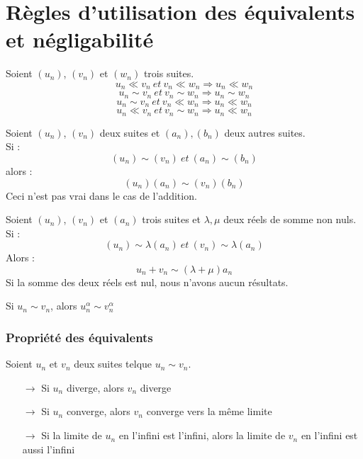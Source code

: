 \section{Règles d'utilisation des équivalents et négligabilité}
\begin{prop}
Soient $(u_n)$, $(v_n)$ et $(w_n)$ trois suites.
$$u_n \ll v_n~ et~ v_n \ll w_n \Rightarrow u_n \ll w_n$$
$$u_n \sim v_n~ et~ v_n \sim w_n \Rightarrow u_n \sim w_n$$
$$u_n \sim v_n~ et~ v_n \ll w_n \Rightarrow u_n \ll w_n$$
$$u_n \ll v_n~ et~ v_n \sim w_n \Rightarrow u_n \ll w_n$$
\end{prop}
\begin{prop}
Soient $(u_n)$, $(v_n)$ deux suites et $(a_n),(b_n)$ deux autres suites.\\
Si :
$$(u_n)\sim(v_n)~ et ~ (a_n)\sim(b_n)$$
alors :
$$(u_n)(a_n) \sim (v_n)(b_n)$$
Ceci n'est pas vrai dans le cas de l'addition.
\end{prop}
\begin{prop}
Soient $(u_n)$, $(v_n)$ et $(a_n)$ trois suites et $\lambda,\mu$ deux réels de somme non nuls.\\
Si :
$$(u_n)\sim\lambda(a_n)~ et ~ (v_n)\sim\lambda(a_n)$$
Alors :
$$u_n + v_n \sim (\lambda+\mu)a_n$$
Si la somme des deux réels est nul, nous n'avons aucun résultats.
\end{prop}
\begin{prop}
Si $u_n \sim v_n$, alors $u_n^{\alpha} \sim v_n^{\alpha}$
\end{prop}
\subsubsection{Propriété des équivalents}
\begin{prop}
Soient $u_n$ et $v_n$ deux suites telque $u_n \sim v_n$.
\begin{itemize}
 \item[$\rightarrow$] Si $u_n$ diverge, alors $v_n$ diverge
\item[$\rightarrow$] Si $u_n$ converge, alors $v_n$ converge vers la même limite
 \item[$\rightarrow$] Si la limite de $u_n$ en l'infini est l'infini, alors la limite de $v_n$ en l'infini est aussi l'infini
\end{itemize}

\end{prop}

